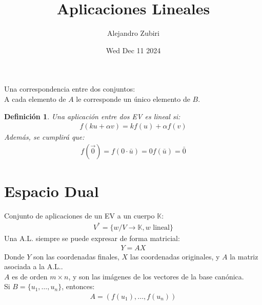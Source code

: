 \documentclass{article}
\author{Alejandro Zubiri}
\date{Wed Dec 11 2024}
\title{Aplicaciones Lineales}
\newtheorem{defin}{Definición}
\begin{document}
\maketitle
\tableofcontents
\pagebreak
Una correspondencia entre dos conjuntos:\\
A cada elemento de $A$ le corresponde un único elemento de $B$.\\
\begin{defin}
    Una aplicación entre dos EV es lineal si:
    \begin{equation}
        \begin{split}
            f(ku + \alpha v) = kf(u) + \alpha f(v)
        \end{split}
    \end{equation}
    Además, se cumplirá que:
    \begin{equation}
        \begin{split}
            f(\vec{0}) = f(0\cdot \bar{u}) = 0f(\bar{u})= \bar{0}
        \end{split}
    \end{equation}
\end{defin}
\section{Espacio Dual}
Conjunto de aplicaciones de un EV a un cuerpo $\mathbb{K}$:
\begin{equation}
    \begin{split}
        V^{*} = \{ w / V \to  \mathbb{K}, w \text{ lineal} \}
    \end{split}
\end{equation}
Una A.L. siempre se puede expresar de forma matricial:
\begin{equation}
    \begin{split}
        Y = AX
    \end{split}
\end{equation}
Donde $Y$ son las coordenadas finales, $X$ las coordenadas originales, y $A$ la matriz asociada
a la A.L..\\
$A$ es de orden $m\times n$, y son las imágenes de los vectores de la base canónica.\\
Si $B = \{ u_{1},\dots,u_{n} \}$, entonces:
\begin{equation}
    \begin{split}
        A = (f(u_{1}), \dots,f(u_{n}))
    \end{split}
\end{equation}
\end{document}
